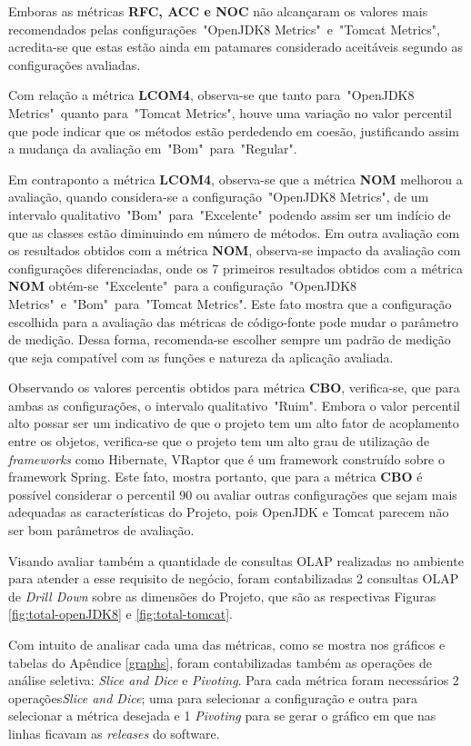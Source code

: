 Emboras as métricas \textbf{RFC, ACC e NOC} não alcançaram os valores mais recomendados pelas configurações~"OpenJDK8 Metrics"~e~"Tomcat Metrics", acredita-se que estas estão ainda em patamares considerado aceitáveis segundo as configurações avaliadas. 

Com relação a métrica \textbf{LCOM4}, observa-se que tanto para~"OpenJDK8 Metrics"~quanto para~"Tomcat Metrics", houve uma variação no valor percentil que pode indicar que os métodos estão perdedendo em coesão, justificando assim a mudança da avaliação em~"Bom"~para~"Regular".

Em contraponto a métrica \textbf{LCOM4}, observa-se que a métrica \textbf{NOM} melhorou a avaliação, quando considera-se a configuração~"OpenJDK8 Metrics", de um intervalo qualitativo~"Bom"~para~"Excelente"~podendo assim ser um indício de que as classes estão diminuindo em número de métodos. Em outra avaliação com os resultados obtidos com a métrica \textbf{NOM}, observa-se impacto da avaliação com configurações diferenciadas, onde  os 7 primeiros resultados obtidos com a métrica \textbf{NOM} obtém-se~"Excelente"~para a configuração~"OpenJDK8 Metrics"~e~"Bom"~para~"Tomcat Metrics". Este fato mostra que a configuração escolhida para a avaliação das métricas de código-fonte pode mudar o parâmetro de medição. Dessa forma, recomenda-se escolher sempre um padrão de medição que seja compatível com as funções e natureza da aplicação avaliada.


Observando os valores percentis obtidos para métrica \textbf{CBO}, verifica-se, que para ambas as configurações, o intervalo qualitativo~"Ruim". Embora o valor percentil alto possar ser um indicativo de que o projeto tem um alto fator de acoplamento entre os objetos, verifica-se que o projeto tem um alto grau de utilização de \textit{frameworks} como Hibernate, VRaptor que é um framework construído sobre o framework Spring. Este fato, mostra portanto, que para a métrica \textbf{CBO} é possível considerar o percentil 90 ou avaliar outras configurações que sejam mais adequadas as características do Projeto, pois OpenJDK e Tomcat parecem não ser bom parâmetros de avaliação.  


Visando avaliar também a quantidade de consultas OLAP realizadas no ambiente para atender a esse requisito de negócio, foram contabilizadas 2 consultas OLAP de \textit{Drill Down} sobre as dimensões do Projeto, que são as respectivas Figuras \ref{fig:total-openJDK8} e \ref{fig:total-tomcat}. 

Com intuito de analisar cada uma das métricas, como se mostra nos gráficos e tabelas do Apêndice \ref{graphs}, foram contabilizadas também as operações de análise seletiva: \textit{Slice and Dice} e \textit{Pivoting}. Para cada métrica foram necessários 2 operações\textit{Slice and Dice}; uma para selecionar a configuração e outra para selecionar a métrica desejada e 1 \textit{Pivoting} para se gerar o gráfico em que nas linhas ficavam as \textit{releases} do software.  
 

